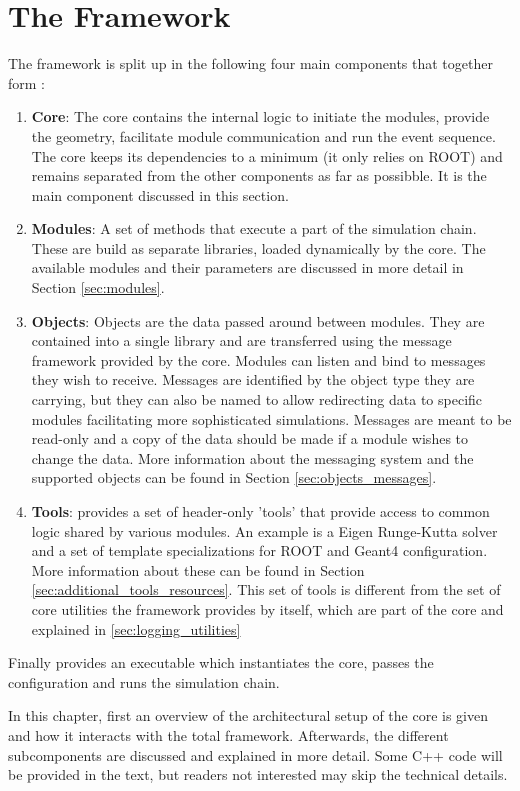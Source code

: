 \section{The \apsq Framework}
\label{sec:framework}
The framework is split up in the following four main components that together form \apsq:
\begin{enumerate}
\item \textbf{Core}: The core contains the internal logic to initiate the modules, provide the geometry, facilitate module communication and run the event sequence. The core keeps its dependencies to a minimum (it only relies on ROOT) and remains separated from the other components as far as possibble. It is the main component discussed in this section.
\item \textbf{Modules}: A set of methods that execute a part of the simulation chain. These are build as separate libraries, loaded dynamically by the core. The available modules and their parameters are discussed in more detail in Section \ref{sec:modules}.
\item \textbf{Objects}: Objects are the data passed around between modules. They are contained into a single library and are transferred using the message framework provided by the core. Modules can listen and bind to messages they wish to receive. Messages are identified by the object type they are carrying, but they can also be named to allow redirecting data to specific modules facilitating more sophisticated simulations. Messages are meant to be read-only and a copy of the data should be made if a module wishes to change the data. More information about the messaging system and the supported objects can be found in Section \ref{sec:objects_messages}.
\item \textbf{Tools}: \apsq provides a set of header-only 'tools' that provide access to common logic shared by various modules. An example is a Eigen Runge-Kutta solver and a set of template specializations for ROOT and Geant4 configuration. More information about these can be found in Section \ref{sec:additional_tools_resources}. This set of tools is different from the set of core utilities the framework provides by itself, which are part of the core and explained in \ref{sec:logging_utilities}
\end{enumerate}
Finally \apsq provides an executable which instantiates the core, passes the configuration and runs the simulation chain.

In this chapter, first an overview of the architectural setup of the core is given and how it interacts with the total \apsq framework. Afterwards, the different subcomponents are discussed and explained in more detail. Some C++ code will be provided in the text, but readers not interested may skip the technical details.

